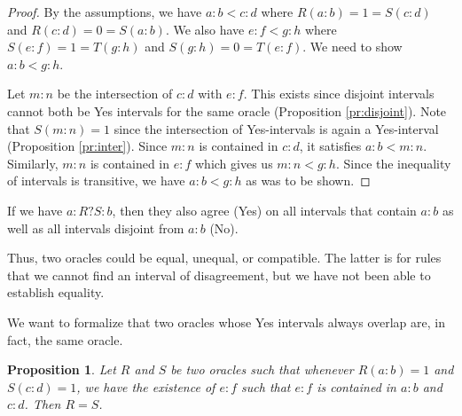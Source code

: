 \documentclass[12pt]{article}
\newtheorem{proposition}{Proposition}
\theoremstyle{remark}
\begin{document}
\begin{proof}
By the assumptions, we have $a:b < c:d$ where $R(a:b) = 1 = S(c:d)$ and $R(c:d) = 0 = S(a:b)$. We also have $e:f < g:h$ where $S(e:f) = 1 = T(g:h)$ and $S(g:h) = 0 = T(e:f)$. We need to show $a:b < g:h$.

Let $m:n$ be the intersection of $c:d$ with $e:f$. This exists since disjoint intervals cannot both be Yes intervals for the same oracle (Proposition \ref{pr:disjoint}). Note that $S(m:n) = 1$ since the intersection of Yes-intervals is again a Yes-interval (Proposition \ref{pr:inter}). Since $m:n$ is contained in $c:d$, it satisfies $a:b < m:n$. Similarly, $m:n$ is contained in $e:f$ which gives us $m:n < g:h$. Since the inequality of intervals is transitive, we have $a:b < g:h$ as was to be shown. 
\end{proof}


If we have $a:R?S:b$, then they also agree (Yes) on all intervals that contain $a:b$ as well as all intervals disjoint from $a:b$ (No). 

Thus, two oracles could be equal, unequal, or compatible. The latter is for rules that we cannot find an interval of disagreement, but we have not been able to establish equality. 

We want to formalize that two oracles whose Yes intervals always overlap are, in fact, the same oracle.

\begin{proposition}\label{pr:overlap}
Let $R$ and $S$ be two oracles such that whenever $R(a:b)=1$ and $S(c:d)=1$, we have the existence of $e:f$ such that $e:f$ is contained in $a:b$ and $c:d$.  Then $R =S$.
\end{proposition}
\end{document}

